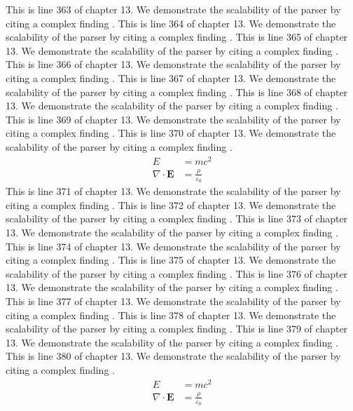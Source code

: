 This is line 363 of chapter 13. We demonstrate the scalability of the parser by citing a complex finding \cite{ref13_363}.
This is line 364 of chapter 13. We demonstrate the scalability of the parser by citing a complex finding \cite{ref13_364}.
This is line 365 of chapter 13. We demonstrate the scalability of the parser by citing a complex finding \cite{ref13_365}.
This is line 366 of chapter 13. We demonstrate the scalability of the parser by citing a complex finding \cite{ref13_366}.
This is line 367 of chapter 13. We demonstrate the scalability of the parser by citing a complex finding \cite{ref13_367}.
This is line 368 of chapter 13. We demonstrate the scalability of the parser by citing a complex finding \cite{ref13_368}.
This is line 369 of chapter 13. We demonstrate the scalability of the parser by citing a complex finding \cite{ref13_369}.
This is line 370 of chapter 13. We demonstrate the scalability of the parser by citing a complex finding \cite{ref13_370}.
\begin{align*}
  E &= mc^2 \\
  \nabla \cdot \mathbf{E} &= \frac{\rho}{\varepsilon_0}
\end{align*}
This is line 371 of chapter 13. We demonstrate the scalability of the parser by citing a complex finding \cite{ref13_371}.
This is line 372 of chapter 13. We demonstrate the scalability of the parser by citing a complex finding \cite{ref13_372}.
This is line 373 of chapter 13. We demonstrate the scalability of the parser by citing a complex finding \cite{ref13_373}.
This is line 374 of chapter 13. We demonstrate the scalability of the parser by citing a complex finding \cite{ref13_374}.
This is line 375 of chapter 13. We demonstrate the scalability of the parser by citing a complex finding \cite{ref13_375}.
This is line 376 of chapter 13. We demonstrate the scalability of the parser by citing a complex finding \cite{ref13_376}.
This is line 377 of chapter 13. We demonstrate the scalability of the parser by citing a complex finding \cite{ref13_377}.
This is line 378 of chapter 13. We demonstrate the scalability of the parser by citing a complex finding \cite{ref13_378}.
This is line 379 of chapter 13. We demonstrate the scalability of the parser by citing a complex finding \cite{ref13_379}.
This is line 380 of chapter 13. We demonstrate the scalability of the parser by citing a complex finding \cite{ref13_380}.
\begin{align*}
  E &= mc^2 \\
  \nabla \cdot \mathbf{E} &= \frac{\rho}{\varepsilon_0}
\end{align*}
